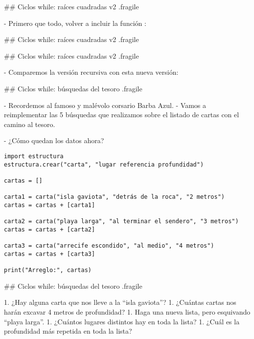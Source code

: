## Ciclos while: raíces cuadradas v2 {.fragile}

- Primero que todo, volver a incluir la función :


## Ciclos while: raíces cuadradas v2 {.fragile}


## Ciclos while: raíces cuadradas v2 {.fragile}

- Comparemos la versión recursiva con esta nueva versión:



## Ciclos while: búsquedas del tesoro {.fragile}

- Recordemos al famoso y malévolo corsario Barba Azul.
- Vamos a reimplementar las 5 búsquedas que realizamos sobre el listado de cartas
con el camino al tesoro.

\pause

- ¿Cómo quedan los datos ahora?

\pause

\begin{lstlisting}[style=frame03]
import estructura
estructura.crear("carta", "lugar referencia profundidad")

cartas = []

carta1 = carta("isla gaviota", "detrás de la roca", "2 metros")
cartas = cartas + [carta1]

carta2 = carta("playa larga", "al terminar el sendero", "3 metros")
cartas = cartas + [carta2]

carta3 = carta("arrecife escondido", "al medio", "4 metros")
cartas = cartas + [carta3]

print("Arreglo:", cartas)
\end{lstlisting}


## Ciclos while: búsquedas del tesoro {.fragile}


1. ¿Hay alguna carta que nos lleve a la ``isla gaviota''?
1. ¿Cuántas cartas nos harán excavar 4 metros de profundidad?
1. Haga una nueva lista, pero esquivando ``playa larga''.
1. ¿Cuántos lugares distintos hay en toda la lista?
1. ¿Cuál es la profundidad más repetida en toda la lista?

